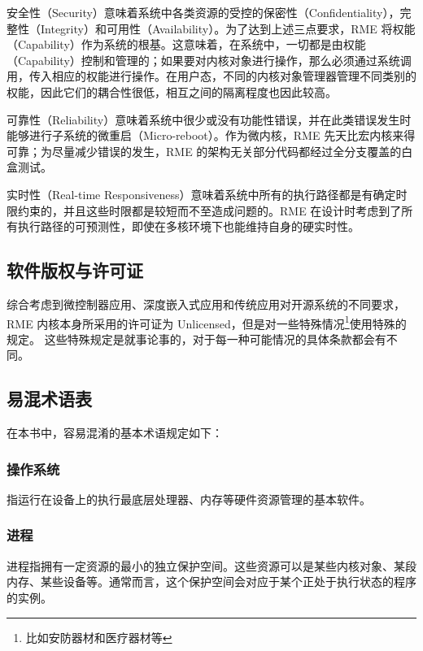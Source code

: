 安全性（Security）意味着系统中各类资源的受控的保密性（Confidentiality），完整性（Integrity）和可用性（Availability）。为了达到上述三点要求，RME 将权能（Capability）作为系统的根基。这意味着，在系统中，一切都是由权能（Capability）控制和管理的；如果要对内核对象进行操作，那么必须通过系统调用，传入相应的权能进行操作。在用户态，不同的内核对象管理器管理不同类别的权能，因此它们的耦合性很低，相互之间的隔离程度也因此较高。

可靠性（Reliability）意味着系统中很少或没有功能性错误，并在此类错误发生时能够进行子系统的微重启（Micro-reboot）。作为微内核，RME 先天比宏内核来得可靠；为尽量减少错误的发生，RME 的架构无关部分代码都经过全分支覆盖的白盒测试。

实时性（Real-time
Responsiveness）意味着系统中所有的执行路径都是有确定时限约束的，并且这些时限都是较短而不至造成问题的。RME 在设计时考虑到了所有执行路径的可预测性，即使在多核环境下也能维持自身的硬实时性。

\subsection{软件版权与许可证}\label{subsec:1-copyright-and-license}

综合考虑到微控制器应用、深度嵌入式应用和传统应用对开源系统的不同要求，RME 内核本身所采用的许可证为 Unlicensed，但是对一些特殊情况\footnote{比如安防器材和医疗器材等}使用特殊的规定。
这些特殊规定是就事论事的，对于每一种可能情况的具体条款都会有不同。

\subsection{易混术语表}\label{subsec:1-terms-and-definitions}

在本书中，容易混淆的基本术语规定如下：

\subsubsection{操作系统}\label{subsubsec:1-operating-system}

指运行在设备上的执行最底层处理器、内存等硬件资源管理的基本软件。

\subsubsection{进程}\label{subsubsec:1-process}

进程指拥有一定资源的最小的独立保护空间。这些资源可以是某些内核对象、某段内存、某些设备等。通常而言，这个保护空间会对应于某个正处于执行状态的程序的实例。

